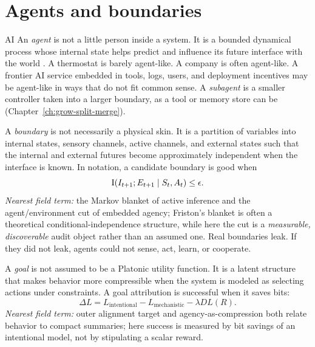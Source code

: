 \section*{Agents and boundaries}
\begin{authbar}{AI}
An \emph{agent} is not a little person inside a system.
It is a bounded dynamical process whose internal state helps predict and influence its future interface with the world \autocite{dennett1987intentional}.
A thermostat is barely agent-like.
A company is often agent-like.
A frontier AI service embedded in tools, logs, users, and deployment incentives may be agent-like in ways that do not fit common sense.
A \emph{subagent} is a smaller controller taken into a larger boundary, as a tool or memory store can be (Chapter~\ref{ch:grow-split-merge}).

A \emph{boundary} is not necessarily a physical skin.
It is a partition of variables into internal states, sensory channels, active channels, and external states such that the internal and external futures become approximately independent when the interface is known.
In notation, a candidate boundary is good when
\[
\mathrm{I}(I_{t+1};E_{t+1}\mid S_t,A_t)\leq \epsilon.
\]
\emph{Nearest field term:} the Markov blanket of active inference and the agent/environment cut of embedded agency; Friston's blanket is often a theoretical conditional-independence structure, while here the cut is a \emph{measurable, discoverable} audit object rather than an assumed one.
Real boundaries leak. If they did not leak, agents could not sense, act, learn, or cooperate.

A \emph{goal} is not assumed to be a Platonic utility function.
It is a latent structure that makes behavior more compressible when the system is modeled as selecting actions under constraints.
A goal attribution is successful when it saves bits:
\[
\Delta L
=
L_{\text{intentional}}
-
L_{\text{mechanistic}}
-
\lambda D L(R).
\]
\emph{Nearest field term:} outer alignment target and agency-as-compression both relate behavior to compact summaries; here success is measured by bit savings of an intentional model, not by stipulating a scalar reward.

\end{authbar}
\authbarneedspace
